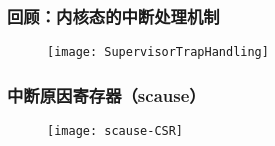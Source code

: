 \begin{frame}
	\frametitle{回顾：内核态的中断处理机制}
	\begin{figure}
	\texttt{[image: SupervisorTrapHandling]}
	\end{figure}
\end{frame}
%
%
%
%
%
%
%
%
%
\begin{frame}   
	\frametitle{中断原因寄存器（scause）}
	\begin{figure}
	\texttt{[image: scause-CSR]}
	\end{figure}
\end{frame}
%

